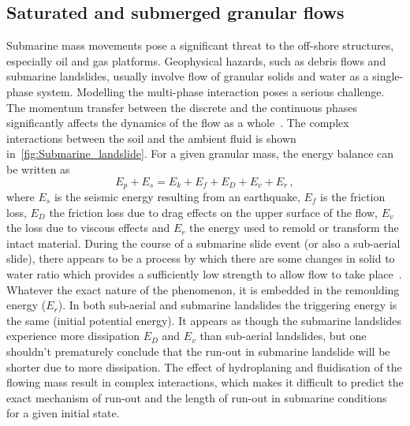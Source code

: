 \subsection{Saturated and submerged granular flows}
Submarine mass movements pose a significant threat to the off-shore structures, 
especially oil and gas platforms. Geophysical hazards, such as debris flows and 
submarine landslides, usually involve flow of granular solids and water as a 
single-phase system. Modelling the multi-phase interaction poses a serious 
challenge. The momentum transfer between the discrete and the continuous phases 
significantly affects the dynamics of the flow as a whole~\citep{Topin2011}. 
The complex interactions between the soil and the ambient fluid is shown 
in~\cref{fig:Submarine_landslide}. For a given granular mass, the energy 
balance can be written as
%
\begin{equation}
E_p + E_s = E_k + E_f + E_D + E_v + E_r\,,
\end{equation}
where $E_s$ is the seismic energy resulting from an earthquake, $E_f$ is the 
friction loss, $E_D$ the friction loss due to drag effects on the upper surface 
of the flow, $E_v$ the loss due to viscous effects and $E_r$ the energy used to 
remold or transform the intact material. During the course of a submarine slide 
event (or also a sub-aerial slide), there appears to be a process by which 
there are some changes in solid to water ratio which provides a sufficiently 
low strength to allow flow to take place~\citep{Locat2002}. Whatever the exact 
nature of the phenomenon, it is embedded in the remoulding energy ($E_r$). In 
both sub-aerial and submarine landslides the triggering energy is the same 
(initial potential energy). It appears as though the submarine landslides 
experience more dissipation $E_D$ and $E_v$ than sub-aerial landslides, but one 
shouldn't prematurely conclude that the run-out in submarine landslide will be 
shorter due to more dissipation. The effect of hydroplaning and fluidisation of 
the flowing mass result in complex interactions, which makes it difficult to 
predict the exact mechanism of run-out and the length of run-out in 
submarine conditions for a given initial state. 

